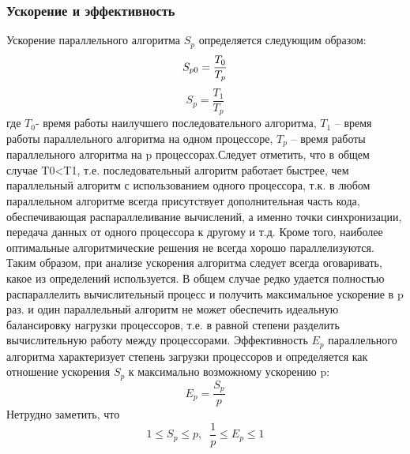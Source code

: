 \subsubsection{Ускорение и эффективность}
Ускорение параллельного алгоритма $S_{p}$ определяется следующим образом:
\begin{equation}
S_{p0}=\frac{T_{0} }{T_{p}} \\
\label{F:100}
\end{equation}
\begin{equation}
S_{p}=\frac{T_{1} }{T_{p}}
\label{F:101}
\end{equation}
где $T_{0}$- время работы наилучшего последовательного алгоритма, $T_{1}$ -- время работы параллельного алгоритма на одном процессоре, $T_{p}$ -- время работы параллельного алгоритма на p процессорах.Следует отметить, что в общем случае T0<T1, т.е. последовательный алгоритм работает быстрее, чем параллельный алгоритм с использованием одного процессора, т.к. в любом параллельном алгоритме всегда присутствует дополнительная часть кода, обеспечивающая распараллеливание вычислений, а именно точки синхронизации, передача данных от одного процессора к другому и т.д. Кроме того, наиболее оптимальные алгоритмические решения не всегда хорошо параллелизуются. Таким образом, при анализе ускорения алгоритма следует всегда оговаривать, какое из определений используется. 
В общем случае редко удается полностью распараллелить вычислительный процесс и получить максимальное ускорение в p раз. и один параллельный алгоритм не может обеспечить идеальную балансировку нагрузки процессоров, т.е. в равной степени разделить вычислительную работу между процессорами. Эффективность $E_{p}$ параллельного алгоритма характеризует степень загрузки процессоров и определяется как отношение ускорения $S_{p}$ к максимально возможному ускорению p:
\begin{equation}
E_{p}=\frac{S_{p} }{p}
\label{F:102}
\end{equation}
Нетрудно заметить, что
\begin{equation}
1\leq S_{p} \leq p,\; \;  \frac{1}{p} \leq E_{p} \leq 1
\label{F:103}
\end{equation}
